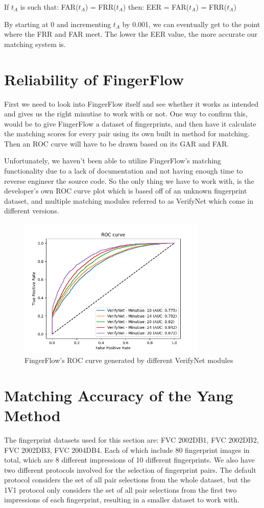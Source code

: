 \documentclass[fyp]{socreport}
\begin{document}
\begin{center}
	If $t_A$ is such that: FAR($t_A$) = FRR($t_A$) then: EER = FAR($t_A$) = FRR($t_A$) 
\end{center}

By starting at 0 and incrementing $t_A$ by 0.001, we can eventually get to the point where the FRR and FAR meet. The lower the EER value, the more accurate our matching system is.

\section{Reliability of FingerFlow}
First we need to look into FingerFlow itself and see whether it works as intended and gives us the right minutiae to work with or not. One way to confirm this, would be to give FingerFlow a dataset of fingerprints, and then have it calculate the matching scores for every pair using its own built in method for matching. Then an ROC curve will have to be drawn based on its GAR and FAR.

Unfortunately, we haven't been able to utilize FingerFlow's matching functionality due to a lack of documentation and not having enough time to reverse engineer the source code. So the only thing we have to work with, is the developer's own ROC curve plot which is based off of an unknown fingerprint dataset, and multiple matching modules referred to as VerifyNet which come in different versions.

\begin{figure}[H]
	\centering
	\includegraphics[width=0.8\textwidth]
	{fingerflow_roc}
	\caption{FingerFlow's ROC curve generated by different VerifyNet modules}
\end{figure}

\section{Matching Accuracy of the Yang Method}
The fingerprint datasets used for this section are: FVC 2002DB1, FVC 2002DB2, FVC 2002DB3, FVC 2004DB4. Each of which include 80 fingerprint images in total, which are 8 different impressions of 10 different fingerprints. We also have two different protocols involved for the selection of fingerprint pairs. The default protocol considers the set of all pair selections from the whole dataset, but the 1V1 protocol only considers the set of all pair selections from the first two impressions of each fingerprint, resulting in a smaller dataset to work with.
\end{document}
